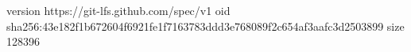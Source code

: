 version https://git-lfs.github.com/spec/v1
oid sha256:43e182f1b672604f6921fe1f7163783ddd3e768089f2c654af3aafc3d2503899
size 128396
